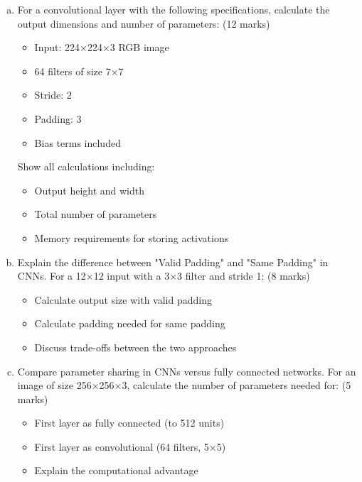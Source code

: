 \documentclass[12pt]{article}
\newcommand{\mediumanswer}{\vspace{3cm}}
\newcommand{\journalspace}{\vspace{4.5cm}}
\begin{document}
\begin{enumerate}[(a)]
    \item For a convolutional layer with the following specifications, calculate the output dimensions and number of parameters: \hfill (12 marks)
    \begin{itemize}
        \item Input: 224×224×3 RGB image
        \item 64 filters of size 7×7
        \item Stride: 2
        \item Padding: 3
        \item Bias terms included
    \end{itemize}
    
    Show all calculations including:
    \begin{itemize}
        \item Output height and width
        \item Total number of parameters
        \item Memory requirements for storing activations
    \end{itemize}
    
    \journalspace
    
    \item Explain the difference between "Valid Padding" and "Same Padding" in CNNs. For a 12×12 input with a 3×3 filter and stride 1: \hfill (8 marks)
    \begin{itemize}
        \item Calculate output size with valid padding
        \item Calculate padding needed for same padding
        \item Discuss trade-offs between the two approaches
    \end{itemize}
    
    \mediumanswer
    
    \item Compare parameter sharing in CNNs versus fully connected networks. For an image of size 256×256×3, calculate the number of parameters needed for: \hfill (5 marks)
    \begin{itemize}
        \item First layer as fully connected (to 512 units)
        \item First layer as convolutional (64 filters, 5×5)
        \item Explain the computational advantage
    \end{itemize}
    
    \mediumanswer
\end{enumerate}
\end{document}
